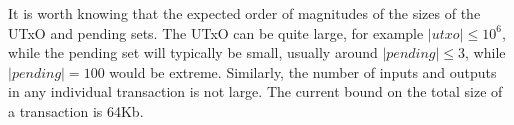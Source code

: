 \documentclass{article}
\numberwithin{equation}{lemma}
\begin{document}
It is worth knowing that the expected
order of magnitudes of the sizes of the UTxO and pending sets. The UTxO can be
quite large, for example $|utxo| \leq 10^6$, while the pending set will
typically be small, usually around $|pending| \leq 3$, while $|pending| = 100$
would be extreme. Similarly, the number of inputs and outputs in any individual
transaction is not large. The current bound on the total size of a transaction
is 64Kb.


%
%
\end{document}
